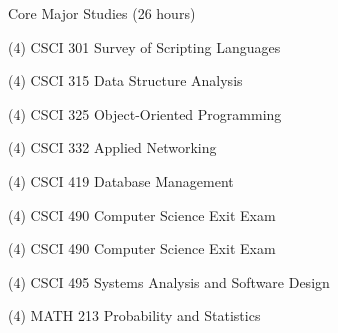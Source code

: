\begin{reqgroup}{Core Major Studies (26 hours)}
\begin{checklist}
\begin{minipage}{0.5\linewidth}
	\item (4) CSCI 301	Survey of Scripting Languages
	\item (4) CSCI 315	Data Structure Analysis
	\item (4) CSCI 325	Object-Oriented Programming
	\item (4) CSCI 332	Applied Networking
\end{minipage}
\begin{minipage}{0.5\linewidth}
	\item (4) CSCI 419	Database Management
	\item (4) CSCI 490	Computer Science Exit Exam
	\item (4) CSCI 490	Computer Science Exit Exam
	\item (4) CSCI 495	Systems Analysis and Software Design
	\item (4) MATH 213	Probability and Statistics
	\end{minipage}
\end{checklist}
\end{reqgroup}

